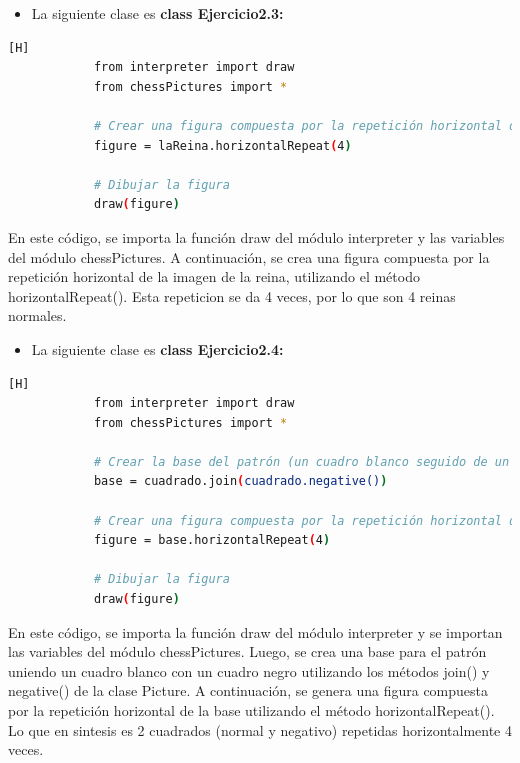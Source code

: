 \documentclass{article}
\begin{document}
\begin{itemize}	
		\item La siguiente clase es \textbf{class Ejercicio2.3:} 
	\end{itemize}
 
	\begin{lstlisting}[language=bash,caption={\textbf{TERCER EJERCICIO}}][H]
            from interpreter import draw
            from chessPictures import *
            
            # Crear una figura compuesta por la repetición horizontal de la imagen de la reina
            figure = laReina.horizontalRepeat(4)
            
            # Dibujar la figura
            draw(figure)
	\end{lstlisting}
En este código, se importa la función draw del módulo interpreter y las variables del módulo chessPictures. A continuación, se crea una figura compuesta por la repetición horizontal de la imagen de la reina, utilizando el método horizontalRepeat(). Esta repeticion se da 4 veces, por lo que son 4 reinas normales.

\begin{itemize}	
		\item La siguiente clase es \textbf{class Ejercicio2.4:} 
	\end{itemize}
 
	\begin{lstlisting}[language=bash,caption={\textbf{CUARTO EJERCICIO}}][H]
            from interpreter import draw
            from chessPictures import *
            
            # Crear la base del patrón (un cuadro blanco seguido de un cuadro negro)
            base = cuadrado.join(cuadrado.negative())
            
            # Crear una figura compuesta por la repetición horizontal de la base
            figure = base.horizontalRepeat(4)
            
            # Dibujar la figura
            draw(figure)
	\end{lstlisting}
En este código, se importa la función draw del módulo interpreter y se importan las variables del módulo chessPictures. Luego, se crea una base para el patrón uniendo un cuadro blanco con un cuadro negro utilizando los métodos join() y negative() de la clase Picture. A continuación, se genera una figura compuesta por la repetición horizontal de la base utilizando el método horizontalRepeat(). Lo que en sintesis es 2 cuadrados (normal y negativo) repetidas horizontalmente 4 veces.
\end{document}
